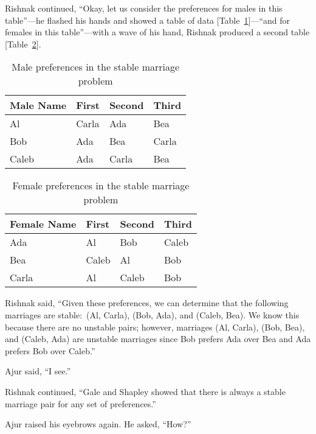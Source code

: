 Rishnak continued, ``Okay, let us consider the preferences for males in this table''---he flashed his hands and showed a table of data [Table~\ref{16t1}]---``and for females in this table''---with a wave of his hand, Rishnak produced a second table [Table~\ref{16t2}].

\begin{table}
\begin{center}
\begin{tabular}{ |p{3cm}||p{1.5cm}||p{1.5cm} || p{1.5cm}|| }
 \hline
 \hline
 Male Name & First&Second&Third\\
 \hline
 Al  & Carla    &Ada&Bea\\
Bob&Ada&Bea&Carla\\
Caleb&Ada&Carla&Bea\\
 
 
 \hline
\end{tabular}
\caption{Male preferences in the stable marriage problem}\label{16t1}
\end{center}
\end{table}
\begin{table}
\begin{center}
\begin{tabular}{ |p{3cm}||p{1.5cm}||p{1.5cm} || p{1.5cm}|| }
 \hline
 \hline
 Female Name & First&Second&Third\\
 \hline
 Ada  & Al    &Bob&Caleb\\
Bea&Caleb&Al&Bob\\
Carla&Al&Caleb&Bob\\
 
 
 \hline
\end{tabular}
\caption{Female preferences in the stable marriage problem}\label{16t2}
\end{center}
\end{table}

Rishnak said, ``Given these preferences, we can determine that the following marriages are stable:~(Al, Carla), (Bob, Ada), and (Caleb, Bea). We know this because there are no unstable pairs; however, marriages (Al, Carla), (Bob, Bea), and (Caleb, Ada) are unstable marriages since Bob prefers Ada over Bea and Ada prefers Bob over Caleb.''

Ajur said, ``I see.''

Rishnak continued, ``Gale and Shapley showed that there is always a stable marriage pair for any set of preferences.''

Ajur raised his eyebrows again.  He asked, ``How?''

